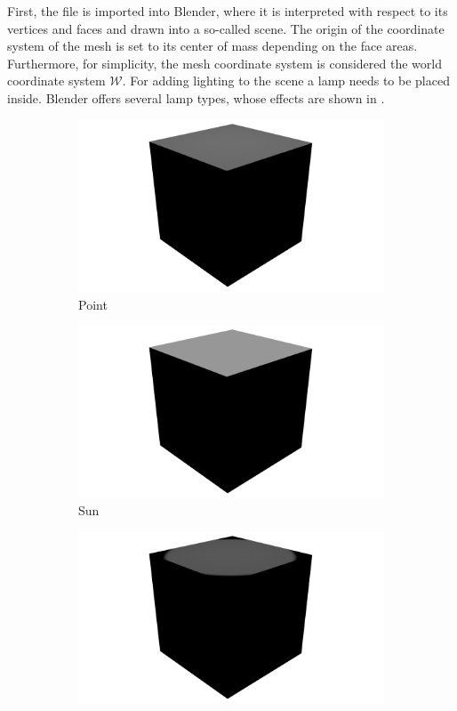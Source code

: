 First, the file is imported into Blender, where it is interpreted with respect to its vertices and faces and drawn into a so-called scene.
The origin of the coordinate system of the mesh is set to its center of mass depending on the face areas.
Furthermore, for simplicity, the mesh coordinate system is considered the world coordinate system $\mathcal{W}$.
For adding lighting to the scene a lamp needs to be placed inside.
Blender offers several lamp types, whose effects are shown in .
\begin{figure}
	\centering
	\begin{subfigure}{0.19\textwidth}
		\centering
		\includegraphics[width=\textwidth]{images/point.png}
		\caption{Point}
	\end{subfigure}
	\begin{subfigure}{0.19\textwidth}
		\centering
		\includegraphics[width=\textwidth]{images/sun.png}
		\caption{Sun}
	\end{subfigure}
	\begin{subfigure}{0.19\textwidth}
		\centering
		\includegraphics[width=\textwidth]{images/spot.png}

\end{subfigure}
\end{figure}
